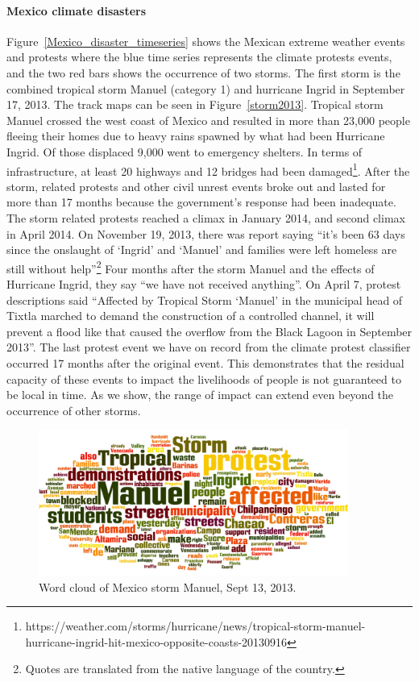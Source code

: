 \paragraph{Mexico climate disasters}
Figure~\ref{Mexico_disaster_timeseries} shows the Mexican extreme weather events and protests where the blue time series represents the climate protests events, and the two red bars shows the occurrence of two storms.
The first storm is the combined tropical storm Manuel (category 1) and hurricane Ingrid in September 17, 2013.
The track maps can be seen in Figure~\ref{storm2013}.
Tropical storm Manuel crossed the west coast of Mexico and resulted in more than 23,000 people fleeing their homes due to heavy rains spawned by what had been Hurricane Ingrid.
Of those displaced 9,000 went to emergency shelters.
In terms of infrastructure, at least 20 highways and 12 bridges had been damaged\footnote{https://weather.com/storms/hurricane/news/tropical-storm-manuel-hurricane-ingrid-hit-mexico-opposite-coasts-20130916}.
After the storm, related protests and other civil unrest events broke out and lasted for more than 17 months because the government's response had been inadequate.
The storm related protests reached a climax in January 2014, and second climax in April 2014.
On November 19, 2013, there was report saying ``it's been 63 days since the onslaught of `Ingrid' and `Manuel' and families were left homeless are still without help''\footnote{Quotes are translated from the native language of the country.}
Four months after the storm Manuel and the effects of Hurricane Ingrid, they say ``we have not received anything''.
On April 7, protest descriptions said ``Affected by Tropical Storm `Manuel' in the municipal head of Tixtla marched to demand the construction of a controlled channel, it will prevent a flood like that caused the overflow from the Black Lagoon in September 2013''.
The last protest event we have on record from the climate protest classifier occurred 17 months after the original event.
This demonstrates that the residual capacity of these events to impact the livelihoods of people is not guaranteed to be local in time.
As we show, the range of impact can extend even beyond the occurrence of other storms.

\begin{figure}[t]
\centerline
{\includegraphics[width=4in]{figures/Mexico_Manuel_wordcloud.png}}
\caption{Word cloud of Mexico storm Manuel, Sept 13, 2013.}
\label{Manuel_word_cloud}
\end{figure}



